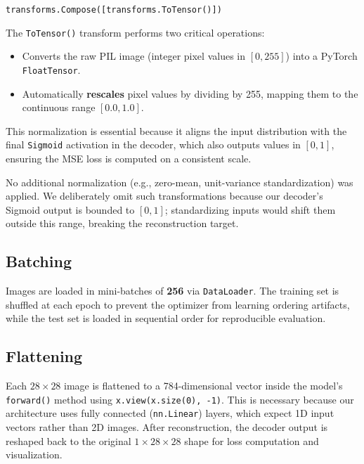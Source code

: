 \documentclass[12pt,a4paper]{article}
\begin{document}
\begin{tcolorbox}[colback=lightgray, colframe=accentblue, title={\color{white}\textbf{Transform Pipeline}}, fonttitle=\bfseries, coltitle=white]
\texttt{transforms.Compose([transforms.ToTensor()])}
\end{tcolorbox}

\noindent The \texttt{\textcolor{accentblue}{ToTensor()}} transform performs two critical operations:
\begin{itemize}
    \item Converts the raw PIL image (integer pixel values in $[0, 255]$) into a PyTorch \texttt{FloatTensor}.
    \item Automatically \textbf{rescales} pixel values by dividing by 255, mapping them to the continuous range $[0.0, 1.0]$.
\end{itemize}
This normalization is essential because it aligns the input distribution with the final \texttt{Sigmoid} activation in the decoder, which also outputs values in $[0, 1]$, ensuring the MSE loss is computed on a consistent scale.

No additional normalization (e.g., zero-mean, unit-variance standardization) was applied. We deliberately omit such transformations because our decoder's Sigmoid output is bounded to $[0, 1]$; standardizing inputs would shift them outside this range, breaking the reconstruction target.

\subsection{Batching}
Images are loaded in mini-batches of \textbf{256} via \texttt{DataLoader}. The training set is shuffled at each epoch to prevent the optimizer from learning ordering artifacts, while the test set is loaded in sequential order for reproducible evaluation.

\subsection{Flattening}
Each $28 \times 28$ image is flattened to a 784-dimensional vector inside the model's \texttt{forward()} method using \texttt{x.view(x.size(0), -1)}. This is necessary because our architecture uses fully connected (\texttt{nn.Linear}) layers, which expect 1D input vectors rather than 2D images. After reconstruction, the decoder output is reshaped back to the original $1 \times 28 \times 28$ shape for loss computation and visualization.
\end{document}
